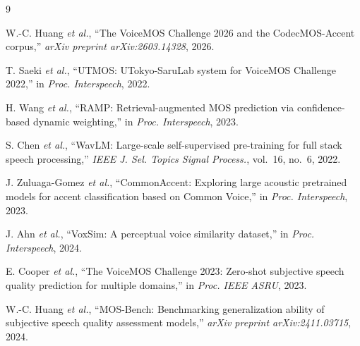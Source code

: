 \documentclass{article}
\begin{document}
\begin{thebibliography}{9}
\small

W.-C. Huang \emph{et al.},
``The VoiceMOS Challenge 2026 and the CodecMOS-Accent corpus,''
\emph{arXiv preprint arXiv:2603.14328}, 2026.

T. Saeki \emph{et al.},
``UTMOS: UTokyo-SaruLab system for VoiceMOS Challenge 2022,''
in \emph{Proc. Interspeech}, 2022.

H. Wang \emph{et al.},
``RAMP: Retrieval-augmented MOS prediction via confidence-based dynamic
weighting,'' in \emph{Proc. Interspeech}, 2023.

S. Chen \emph{et al.},
``WavLM: Large-scale self-supervised pre-training for full stack speech
processing,'' \emph{IEEE J. Sel. Topics Signal Process.}, vol.~16, no.~6, 2022.

J. Zuluaga-Gomez \emph{et al.},
``CommonAccent: Exploring large acoustic pretrained models for accent
classification based on Common Voice,'' in \emph{Proc. Interspeech}, 2023.

J. Ahn \emph{et al.},
``VoxSim: A perceptual voice similarity dataset,''
in \emph{Proc. Interspeech}, 2024.

E. Cooper \emph{et al.},
``The VoiceMOS Challenge 2023: Zero-shot subjective speech quality prediction
for multiple domains,'' in \emph{Proc. IEEE ASRU}, 2023.

W.-C. Huang \emph{et al.},
``MOS-Bench: Benchmarking generalization ability of subjective speech quality
assessment models,'' \emph{arXiv preprint arXiv:2411.03715}, 2024.

\end{thebibliography}
\end{document}
